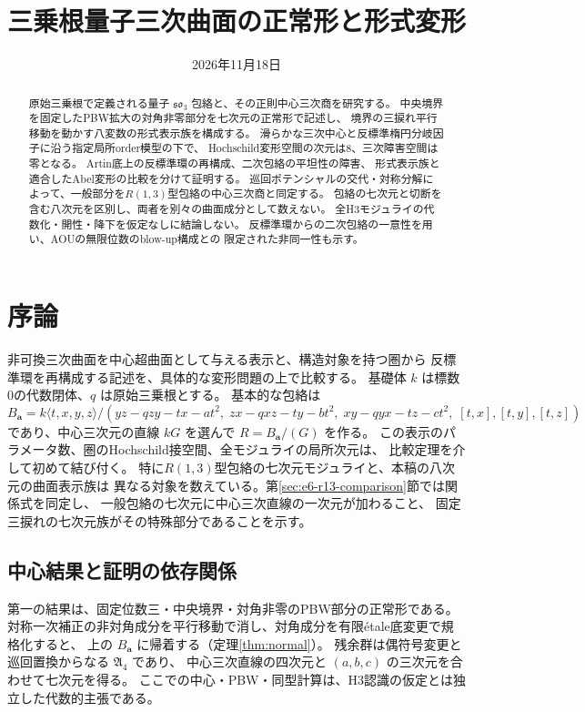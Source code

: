 \documentclass[11pt,a4paper]{ltjsarticle}
\title{三乗根量子三次曲面の正常形と形式変形}
\author{}
\date{2026年11月18日\quad \PublicationVersion}
\begin{document}
\maketitle
\begin{abstract}
原始三乗根で定義される量子 $\mathfrak{so}_3$ 包絡と、その正則中心三次商を研究する。
中央境界を固定したPBW拡大の対角非零部分を七次元の正常形で記述し、
境界の三捩れ平行移動を動かす八変数の形式表示族を構成する。
滑らかな三次中心と反標準楕円分岐因子に沿う指定局所order模型の下で、
Hochschild変形空間の次元は8、三次障害空間は零となる。
Artin底上の反標準環の再構成、二次包絡の平坦性の障害、
形式表示族と適合したAbel変形の比較を分けて証明する。
巡回ポテンシャルの交代・対称分解によって、一般部分を$R(1,3)$型包絡の中心三次商と同定する。
包絡の七次元と切断を含む八次元を区別し、両者を別々の曲面成分として数えない。
全H3モジュライの代数化・開性・降下を仮定なしに結論しない。
反標準環からの二次包絡の一意性を用い、AOUの無限位数のblow-up構成との
限定された非同一性も示す。
\end{abstract}

\section{序論}\label{sec:e6-introduction}
非可換三次曲面を中心超曲面として与える表示と、構造対象を持つ圏から
反標準環を再構成する記述を、具体的な変形問題の上で比較する。
基礎体 $k$ は標数0の代数閉体、$q$ は原始三乗根とする。
基本的な包絡は
\[
 B_{\mathbf a}=k\langle t,x,y,z\rangle/
 (yz-qzy-tx-at^2,\;zx-qxz-ty-bt^2,\;xy-qyx-tz-ct^2,\;[t,x],[t,y],[t,z])
\]
であり、中心三次元の直線 $kG$ を選んで $R=B_{\mathbf a}/(G)$ を作る。
この表示のパラメータ数、圏のHochschild接空間、全モジュライの局所次元は、
比較定理を介して初めて結び付く。
特に$R(1,3)$型包絡の七次元モジュライと、本稿の八次元の曲面表示族は
異なる対象を数えている。第\ref{sec:e6-r13-comparison}節では関係式を同定し、
一般包絡の七次元に中心三次直線の一次元が加わること、
固定三捩れの七次元族がその特殊部分であることを示す。

\subsection{中心結果と証明の依存関係}
第一の結果は、固定位数三・中央境界・対角非零のPBW部分の正常形である。
対称一次補正の非対角成分を平行移動で消し、対角成分を有限\'etale底変更で規格化すると、
上の $B_{\mathbf a}$ に帰着する（定理\ref{thm:normal}）。
残余群は偶符号変更と巡回置換からなる $\mathfrak A_4$ であり、
中心三次直線の四次元と $(a,b,c)$ の三次元を合わせて七次元を得る。
ここでの中心・PBW・同型計算は、H3認識の仮定とは独立した代数的主張である。
\end{document}
